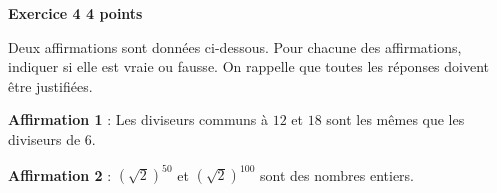 \textbf{Exercice 4 \hfill 4 points}

\medskip 

Deux affirmations sont données ci-dessous. Pour chacune des affirmations, indiquer si elle est vraie ou fausse. On rappelle que toutes les réponses doivent être justifiées.

\medskip
 
\textbf{Affirmation 1} : Les diviseurs communs à $12$ et $18$ sont les mêmes que les diviseurs de $6$. 

\textbf{Affirmation 2} : $\left(\sqrt{2}\right)^{50}$ 	et $\left(\sqrt{2}\right)^{100}$ 	sont des nombres entiers. 

\bigskip


